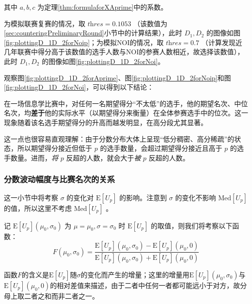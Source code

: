            其中 $a,b,c$ 为定理\ref{thm:formulaforXAprime}中的系数。

            \vspace{1.5ex}

            为模拟联赛复赛的情况，取 $\textit{thres}=0.1053$ （该数值为\ref{sec:counteringPreliminaryRound}小节中的计算结果），此时 $D_1,D_2$ 的图像如图\ref{fig:plottingD_1D_2forNoip}；为模拟NOI的情况，取 $\textit{thres}=0.7$ （计算发现近几年联赛中得分高于该数值的选手人数与NOI的参赛人数相近，故选择该数值），此时 $D_1,D_2$ 的图像如图\ref{fig:plottingD_1D_2forNoi}。

            \vspace{1.5ex}

            观察图\ref{fig:plottingD_1D_2forAprime}、图\ref{fig:plottingD_1D_2forNoip}和图\ref{fig:plottingD_1D_2forNoi}，可以得到以下结论：

            \begin{tcolorbox}[colback=white,colframe=black,boxrule=0.5pt,arc=0pt]
                在一场信息学比赛中，对任何一名期望得分“不太低”的选手，他的期望名次、中位名次，均\textbf{差于}他的实际水平（以期望得分来衡量）在全体参赛选手中的位次。这一现象随着该名选手期望得分的升高而越发明显，在高分段尤其显著。
            \end{tcolorbox}

            这一点也很容易直观理解：由于分数分布大体上呈现“低分稠密、高分稀疏”的状态，所以期望得分接近但低于 $p$ 的选手数量，会超过期望得分接近且高于 $p$ 的选手数量。进而，\emph{将} $p$ 反超的人数，就会大于\emph{被} $p$ 反超的人数。

        \subsubsection{分数波动幅度与比赛名次的关系}

            这一小节中将考察 $\sigma$ 的变化对 $\mathrm{E}\left[U_p\right]$ 的影响。注意到 $\sigma$ 的变化不影响 $\mathrm{Med}\left[U_p\right]$ 的值，所以这里不考虑 $\mathrm{Med}\left[U_p\right]$ 。

            记 $\mathrm{E}\left[U_p\right](\mu_0,\sigma_0)$ 为 $\mu=\mu_0,\sigma=\sigma_0$ 时 $\mathrm{E}\left[U_p\right]$ 的取值，则我们将考察以下函数：
            $$
            F(\mu_0,\sigma_0)=\frac{\mathrm{E}\left[U_p\right](\mu_0,\sigma_0)-\mathrm{E}\left[U_p\right](\mu_0,0)}{\mathrm{E}\left[U_p\right](\mu_0,\sigma_0)+\mathrm{E}\left[U_p\right](\mu_0,0)}
            $$

            函数$F$的含义是$\mathrm{E}\left[U_p\right]$随$\sigma$的变化而产生的增量；这里的增量用$\mathrm{E}\left[U_p\right](\mu_0,\sigma_0)$与$\mathrm{E}\left[U_p\right](\mu_0,0)$的相对差值来描述，由于二者中任何一者都可能远小于对方，故分母上取二者之和而非二者之一。

